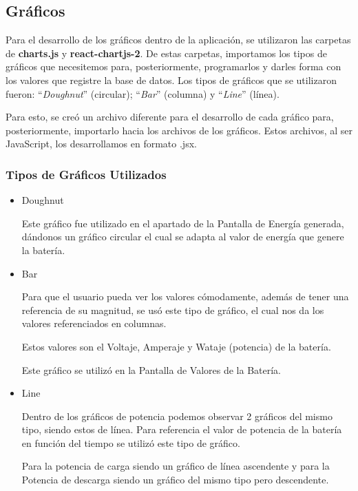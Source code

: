             \subsection{Gráficos}
                Para el desarrollo de los gráficos dentro de la aplicación, se utilizaron las carpetas de \textbf{charts.js} y \textbf{react-chartjs-2}. De estas carpetas, importamos los tipos de gráficos que necesitemos para, posteriormente, programarlos y darles forma con los valores que registre la base de datos. Los tipos de gráficos que se utilizaron fueron: “\textit{Doughnut}” (circular); “\textit{Bar}” (columna) y “\textit{Line}” (línea).\par
                Para esto, se creó un archivo diferente para el desarrollo de cada gráfico para, posteriormente, importarlo hacia los archivos de los gráficos. Estos archivos, al ser JavaScript, los desarrollamos en formato .jsx.\par

                \subsubsection{Tipos de Gráficos Utilizados}
                \begin{itemize} [label=•]
                \setlength{\itemindent}{1.5em}
                
                    \item Doughnut\par
                        Este gráfico fue utilizado en el apartado de la Pantalla de Energía generada, dándonos un gráfico circular el cual se adapta al valor de energía que genere la batería.\par
                        
                    \item Bar\par
                        Para que el usuario pueda ver los valores cómodamente, además de tener una referencia de su magnitud, se usó este tipo de gráfico, el cual nos da los valores referenciados en columnas.\par
                        Estos valores son el Voltaje, Amperaje y Wataje (potencia) de la batería.\par
                        Este gráfico se utilizó en la Pantalla de Valores de la Batería.\par
                        
                    \item Line\par
                        Dentro de los gráficos de potencia podemos observar 2 gráficos del mismo tipo, siendo estos de línea. Para referencia el valor de potencia de la batería en función del tiempo se utilizó este tipo de gráfico.\par
                        Para la potencia de carga siendo un gráfico de línea ascendente y para la Potencia de descarga siendo un gráfico del mismo tipo pero descendente.\par
                \end{itemize}
                
